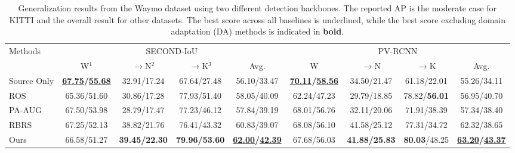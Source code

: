 \label{experiment}

\begin{table*}[t!]
    \small
    \centering
        \caption{Generalization results from the Waymo dataset using two different detection backbones. The reported AP is the moderate case for KITTI and the overall result for other datasets. The best score across all baselines is underlined, while the best score excluding domain adaptation (DA) methods is indicated in \textbf{bold}. }

        \begin{adjustbox}{max width=\textwidth}
        \begin{tabular}
            { l | c | c c | c | c | c c | c }
            \toprule[1.5pt]
             \multirow{2}{*}{Methods} & 
             \multicolumn{4}{c|}{SECOND-IoU}  & 
             \multicolumn{4}{c}{PV-RCNN}
             \\
             
             \cline{2-9}  &
             W$^{1}$ & $\rightarrow$N$^{2}$ & $\rightarrow$K$^{3}$ & Avg. & 
             W & $\rightarrow$N & $\rightarrow$K & Avg.   
             \\ \hline
    
             Source Only & \textbf{\underline{67.75}/\underline{55.68}} & 32.91/17.24 & 67.64/27.48 & 56.10/33.47
             & \textbf{\underline{70.11}/\underline{58.56}} & 34.50/21.47 & 61.18/22.01 & 55.26/34.11 \\ \hline
             
             ROS~\cite{yang2021st3d} & 65.36/51.60 & 30.86/17.28 & 77.93/51.40 & 58.05/40.09
             & 62.24/47.23 & 29.79/18.85 &  78.82/\textbf{56.01} & 56.95/40.70 \\

             PA-AUG~\cite{choi2021part} & 67.50/53.98 & 28.79/17.47 & 77.23/46.12 & 57.84/39.19 
             & 68.01/56.76 & 32.11/20.06 & 71.91/38.39 & 57.34/38.40 \\
             
             RBRS~\cite{hu2023density} & 67.25/52.13 & 38.82/21.76 & 76.41/43.32 & 60.83/39.07
             & 68.08/56.10 & 41.58/25.12 & 77.31/34.72 & 62.32/38.65 \\ 
             
             Ours & 66.58/51.27 & \textbf{39.45/22.30} & \textbf{79.96/53.60} & \textbf{\underline{62.00}/\underline{42.39}}
             & 67.68/56.03 & \textbf{41.88/25.83} & \textbf{80.03}/48.25 & \textbf{\underline{63.20}/\underline{43.37}} \\ \hline
             

\end{tabular}
\end{adjustbox}
\end{table*}
